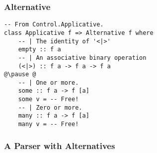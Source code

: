 \begin{frame}[fragile]

\frametitle{Alternative}

\begin{lstlisting}[escapeinside=@@]
-- From Control.Applicative.
class Applicative f => Alternative f where
    -- | The identity of '<|>'
    empty :: f a
    -- | An associative binary operation
    (<|>) :: f a -> f a -> f a
@\pause @
    -- | One or more.
    some :: f a -> f [a]
    some v = -- Free!
    -- | Zero or more.
    many :: f a -> f [a]
    many v = -- Free!
\end{lstlisting}

\end{frame}


\begin{frame}[fragile]

\frametitle{A Parser with Alternatives}









\end{frame}
